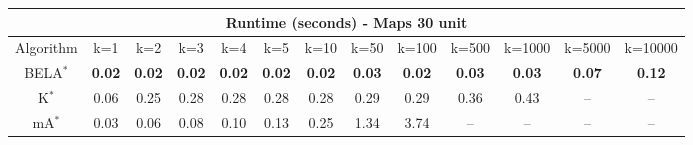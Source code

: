 \begin{tabular}{c|cccccccccccc}\toprule
\multicolumn{13}{c}{Runtime (seconds) - Maps 30 unit}\\ \midrule
Algorithm & k=1 & k=2 & k=3 & k=4 & k=5 & k=10 & k=50 & k=100 & k=500 & k=1000 & k=5000 & k=10000 \\ \midrule
BELA$^*$ & \textbf{0.02} & \textbf{0.02} & \textbf{0.02} & \textbf{0.02} & \textbf{0.02} & \textbf{0.02} & \textbf{0.03} & \textbf{0.02} & \textbf{0.03} & \textbf{0.03} & \textbf{0.07} & \textbf{0.12} \\
K$^*$ & 0.06 & 0.25 & 0.28 & 0.28 & 0.28 & 0.28 & 0.29 & 0.29 & 0.36 & 0.43 & -- & -- \\
mA$^*$ & 0.03 & 0.06 & 0.08 & 0.10 & 0.13 & 0.25 & 1.34 & 3.74 & -- & -- & -- & -- \\ \bottomrule 
\end{tabular}
